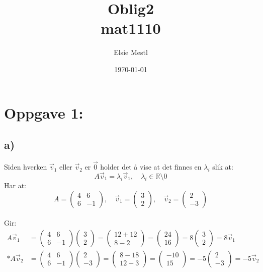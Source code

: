 \documentclass[a4paper, norsk, twoside, 10pt]{article}
\date{\today}
\title{Oblig2 \\ mat1110}
\author{Elsie Mestl}
\begin{document}
\maketitle
  \section*{Oppgave 1:}


  
  \subsection*{a)}

  Siden hverken $\vec{v}_{1}$ eller $\vec{v}_{2}$ er $\vec{0}$ holder det å vise at det finnes en $\lambda_{i}$ slik at:
  \[A\vec{v}_{1}  = \lambda_{i} \vec{v}_{1} , \quad \lambda_{i} \in \mathbb{R}\setminus{0} \]
  Har at: 
  \def\matriseA{
  \begin{pmatrix}
    4 & 6 \\
    6 & -1
  \end{pmatrix}
  }
  \def\ven{
  \begin{pmatrix}
    3 \\
    2
  \end{pmatrix}
  }
  \def\vto{
  \begin{pmatrix}
    2\\
    -3
  \end{pmatrix}
  }
  \[A = \matriseA, \quad \vec{v}_{1} = \ven, \quad \vec{v}_{2} = \vto\]
  \\
Gir:
\[\begin{split}
A\vec{v}_{1} &= \matriseA \ven =
\begin{pmatrix}
  12 +12 \\
  8 - 2
\end{pmatrix}
=
\begin{pmatrix}
  24 \\
  16
\end{pmatrix}
= 8 \ven = 8 \vec{v}_{1} \\*
A\vec{v}_{2} &= \matriseA \vto =
\begin{pmatrix}
  8 - 18 \\
  12 +3
\end{pmatrix}
=
\begin{pmatrix}
  -10 \\
  15
\end{pmatrix}
= -5 \vto = -5 \vec{v}_{2}
\end{split}
\]
\end{document}
